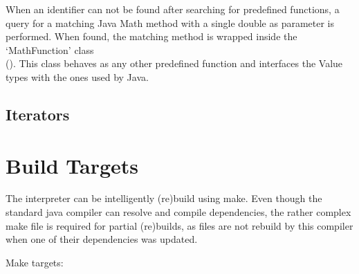 When an identifier can not be found after searching for predefined functions, a query for a matching Java Math method with a single double as parameter is performed. When found, the matching method is wrapped inside the `MathFunction' class\\ (). This class behaves as any other predefined function and interfaces the \setlX{} Value types with the ones used by Java.
\subsection{Iterators}


\section{Build Targets}

The interpreter can be intelligently (re)build using make. Even though the standard java compiler can resolve and compile dependencies, the rather complex make file is required for partial (re)builds, as files are not rebuild by this compiler when one of their dependencies was updated.

Make targets:

